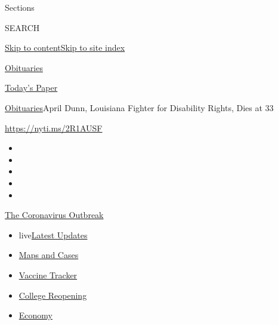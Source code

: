 Sections

SEARCH

\protect\hyperlink{site-content}{Skip to
content}\protect\hyperlink{site-index}{Skip to site index}

\href{https://www.nytimes.com/section/obituaries}{Obituaries}

\href{https://myaccount.nytimes.com/auth/login?response_type=cookie\&client_id=vi}{}

\href{https://www.nytimes.com/section/todayspaper}{Today's Paper}

\href{/section/obituaries}{Obituaries}\textbar{}April Dunn, Louisiana
Fighter for Disability Rights, Dies at 33

\url{https://nyti.ms/2R1AUSF}

\begin{itemize}
\item
\item
\item
\item
\item
\end{itemize}

\href{https://www.nytimes.com/news-event/coronavirus?action=click\&pgtype=Article\&state=default\&region=TOP_BANNER\&context=storylines_menu}{The
Coronavirus Outbreak}

\begin{itemize}
\tightlist
\item
  live\href{https://www.nytimes.com/2020/08/03/world/coronavirus-covid-19.html?action=click\&pgtype=Article\&state=default\&region=TOP_BANNER\&context=storylines_menu}{Latest
  Updates}
\item
  \href{https://www.nytimes.com/interactive/2020/us/coronavirus-us-cases.html?action=click\&pgtype=Article\&state=default\&region=TOP_BANNER\&context=storylines_menu}{Maps
  and Cases}
\item
  \href{https://www.nytimes.com/interactive/2020/science/coronavirus-vaccine-tracker.html?action=click\&pgtype=Article\&state=default\&region=TOP_BANNER\&context=storylines_menu}{Vaccine
  Tracker}
\item
  \href{https://www.nytimes.com/2020/08/02/us/covid-college-reopening.html?action=click\&pgtype=Article\&state=default\&region=TOP_BANNER\&context=storylines_menu}{College
  Reopening}
\item
  \href{https://www.nytimes.com/live/2020/08/03/business/stock-market-today-coronavirus?action=click\&pgtype=Article\&state=default\&region=TOP_BANNER\&context=storylines_menu}{Economy}
\end{itemize}


